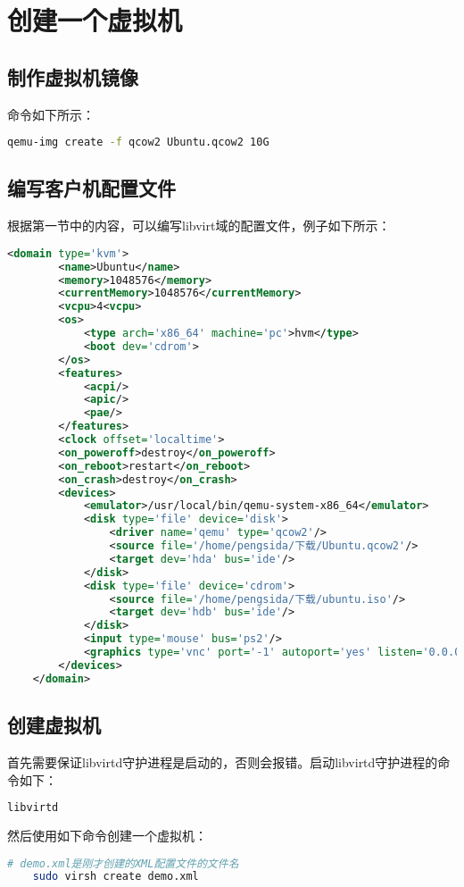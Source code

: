 \documentclass[a4paper,left=2.5cm,right=2.5cm,11pt]{article}
\begin{document}
\section{创建一个虚拟机}
\subsection{制作虚拟机镜像}
	命令如下所示：
	\begin{lstlisting}[language = bash]
	qemu-img create -f qcow2 Ubuntu.qcow2 10G
	\end{lstlisting}

\subsection{编写客户机配置文件}
	根据第一节中的内容，可以编写libvirt域的配置文件，例子如下所示：
	\begin{lstlisting}[language = XML]
	<domain type='kvm'>
		<name>Ubuntu</name>
		<memory>1048576</memory>
		<currentMemory>1048576</currentMemory>
		<vcpu>4<vcpu>
		<os>
			<type arch='x86_64' machine='pc'>hvm</type>
			<boot dev='cdrom'>
		</os>
		<features>
			<acpi/>
			<apic/>
			<pae/>
		</features>
		<clock offset='localtime'>
		<on_poweroff>destroy</on_poweroff>
		<on_reboot>restart</on_reboot>
		<on_crash>destroy</on_crash>
		<devices>
			<emulator>/usr/local/bin/qemu-system-x86_64</emulator>
			<disk type='file' device='disk'>
				<driver name='qemu' type='qcow2'/>
				<source file='/home/pengsida/下载/Ubuntu.qcow2'/>
				<target dev='hda' bus='ide'/>
			</disk>
			<disk type='file' device='cdrom'>
				<source file='/home/pengsida/下载/ubuntu.iso'/>
				<target dev='hdb' bus='ide'/>
			</disk>
			<input type='mouse' bus='ps2'/>
			<graphics type='vnc' port='-1' autoport='yes' listen='0.0.0.0' keymap='en-us'/>
		</devices>
	</domain>
	\end{lstlisting}

\subsection{创建虚拟机}
	首先需要保证libvirtd守护进程是启动的，否则会报错。启动libvirtd守护进程的命令如下：
	\begin{lstlisting}[language = bash]
	libvirtd
	\end{lstlisting}

	然后使用如下命令创建一个虚拟机：
	\begin{lstlisting}[language = bash]
	# demo.xml是刚才创建的XML配置文件的文件名
	sudo virsh create demo.xml
	\end{lstlisting}
\end{document}
